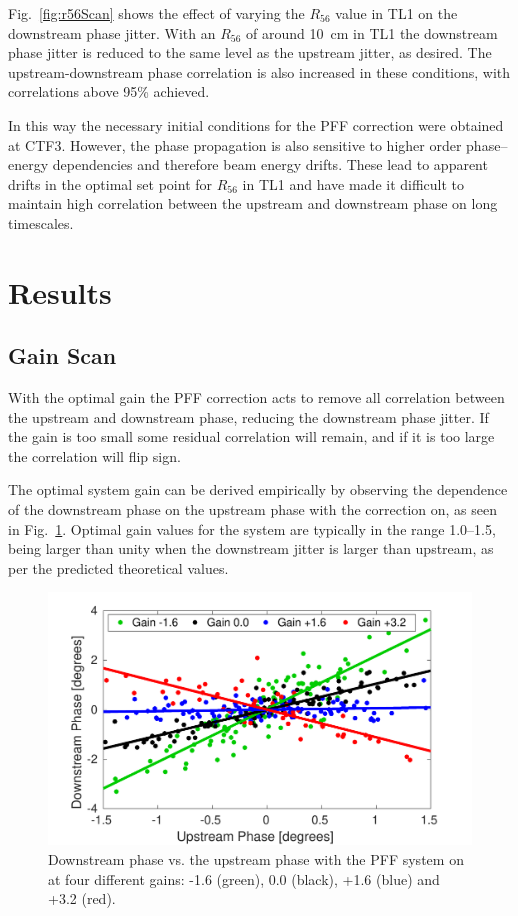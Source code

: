 \documentclass[%
 reprint,
 amsmath,amssymb,
 prl,
]{revtex4-1}
\begin{document}
Fig.~\ref{fig:r56Scan} shows the effect of varying the \(R_{56}\) value in TL1 
on the downstream phase jitter. With an \(R_{56}\) of around 10~cm in TL1 the 
downstream phase jitter is reduced to the same level as the upstream jitter, as 
desired. The upstream-downstream phase correlation is also increased in these 
conditions, with correlations above 95\% achieved.

In this way the necessary initial conditions for the PFF correction were 
obtained at CTF3. However, the phase propagation is also sensitive to higher 
order phase--energy dependencies and therefore beam energy drifts. These lead 
to apparent drifts in the optimal set point for \(R_{56}\) in TL1 and have made 
it difficult to maintain high correlation between the upstream and downstream 
phase on long timescales.

\section{\label{s:results}Results}

\subsection{\label{ss:gScan}Gain Scan}

With the optimal gain the PFF correction acts to remove all correlation between 
the upstream and downstream phase, reducing the downstream phase jitter. If the 
gain is too small some residual correlation will remain, and if it is too large 
the correlation will flip sign. 

The optimal system gain can be derived empirically by observing the dependence 
of the downstream phase on the upstream phase with the correction on, as seen 
in Fig.~\ref{fig:gScan}. Optimal gain values for the system are typically in 
the range 1.0--1.5, being larger than unity when the downstream jitter is 
larger than upstream, as per the predicted theoretical values. 

\begin{figure}
\includegraphics[width=\columnwidth]{figs/gScan}%
\caption{\label{fig:gScan}Downstream phase vs. the upstream phase with the PFF 
system on at four different gains: -1.6 (green), 0.0 (black), +1.6 (blue) and 
+3.2 (red).}
\end{figure}
\end{document}
